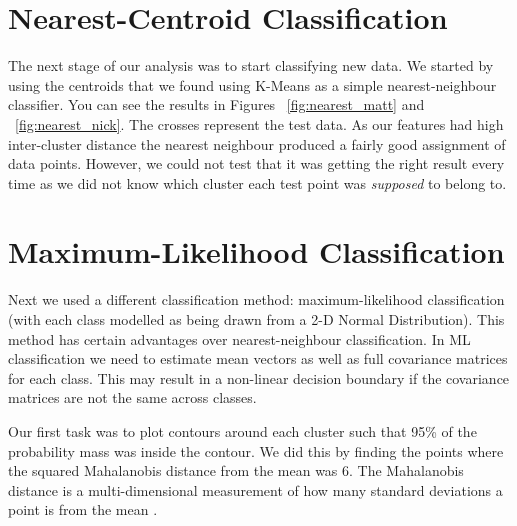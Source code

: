\documentclass[11pt, a4paper]{article}
\begin{document}
\section{Nearest-Centroid Classification}
The next stage of our analysis was to start classifying new data. We started by using the centroids that we found using K-Means as a simple nearest-neighbour classifier. You can see the results in Figures ~\ref{fig:nearest_matt} and ~\ref{fig:nearest_nick}. The crosses represent the test data. As our features had high inter-cluster distance the nearest neighbour produced a fairly good assignment of data points. However, we could not test that it was getting the right result every time as we did not know which cluster each test point was \textit{supposed} to belong to.





\section{Maximum-Likelihood Classification}
Next we used a different classification method: maximum-likelihood classification (with each class modelled as being drawn from a 2-D Normal Distribution). This method has certain advantages over nearest-neighbour classification. In ML classification we need to estimate mean vectors as well as full covariance matrices for each class. This may result in a non-linear decision boundary if the covariance matrices are not the same across classes. \nocite{ml_wiki} \nocite{mvn_wiki}

Our first task was to plot contours around each cluster such that 95\% of the probability mass was inside the contour. We did this by finding the points where the squared Mahalanobis distance from the mean was 6. The Mahalanobis distance is a multi-dimensional measurement of how many standard deviations a point is from the mean \cite{mal_wiki}.
\end{document}
